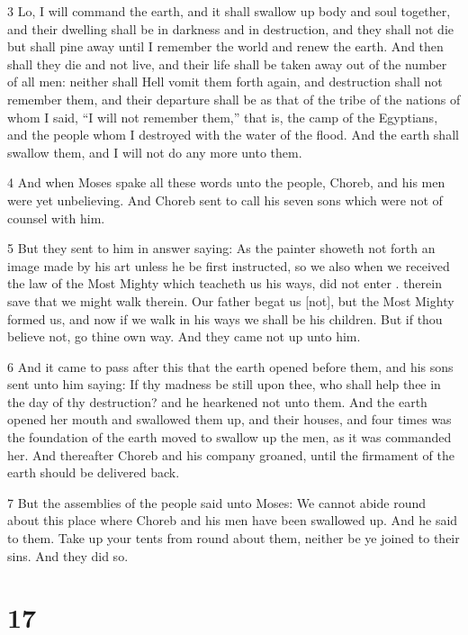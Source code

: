 \par 3 Lo, I will command the earth, and it shall swallow up body and soul together, and their dwelling shall be in darkness and in destruction, and they shall not die but shall pine away until I remember the world and renew the earth. And then shall they die and not live, and their life shall be taken away out of the number of all men: neither shall Hell vomit them forth again, and destruction shall not remember them, and their departure shall be as that of the tribe of the nations of whom I said, “I will not remember them,” that is, the camp of the Egyptians, and the people whom I destroyed with the water of the flood. And the earth shall swallow them, and I will not do any more unto them. 

\par 4 And when Moses spake all these words unto the people, Choreb, and his men were yet unbelieving. And Choreb sent to call his seven sons which were not of counsel with him. 

\par 5 But they sent to him in answer saying: As the painter showeth not forth an image made by his art unless he be first instructed, so we also when we received the law of the Most Mighty which teacheth us his ways, did not enter . therein save that we might walk therein. Our father begat us [not], but the Most Mighty formed us, and now if we walk in his ways we shall be his children. But if thou believe not, go thine own way. And they came not up unto him.

\par 6 And it came to pass after this that the earth opened before them, and his sons sent unto him saying: If thy madness be still upon thee, who shall help thee in the day of thy destruction? and he hearkened not unto them. And the earth opened her mouth and swallowed them up, and their houses, and four times was the foundation of the earth moved to swallow up the men, as it was commanded her. And thereafter Choreb and his company groaned, until the firmament of the earth should be delivered back. 

\par 7 But the assemblies of the people said unto Moses: We cannot abide round about this place where Choreb and his men have been swallowed up. And he said to them. Take up your tents from round about them, neither be ye joined to their sins. And they did so.

\chapter{17}


